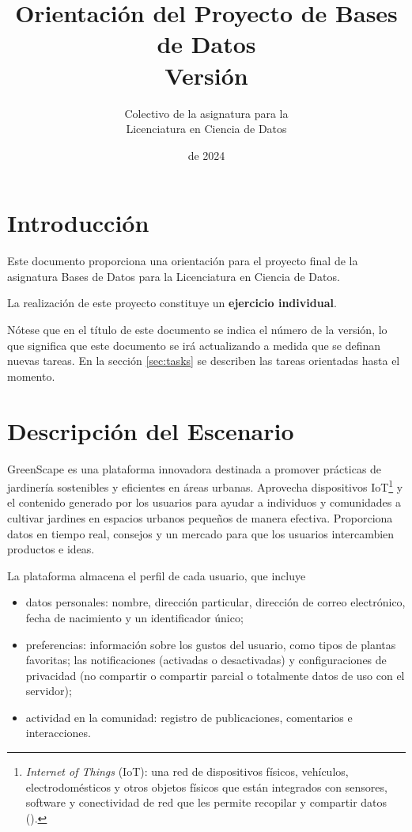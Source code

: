 \documentclass{article}
\title{Orientación del Proyecto de Bases de Datos\\{\large Versi\'on \replaced{2}{1}}}
\author{Colectivo de la asignatura para la\\ Licenciatura en Ciencia de Datos}
\date{\replaced{23 de marzo}{15 de febrero} de 2024}
\begin{document}
\maketitle

\section{Introducción}
Este documento proporciona una orientación para el proyecto final de la asignatura Bases de Datos para la Licenciatura en Ciencia de Datos. 

La realizaci\'on de este proyecto constituye un \textbf{ejercicio individual}.

N\'otese que en el t\'itulo de este documento se indica el n\'umero de la versi\'on, lo que significa que este documento se ir\'a actualizando a medida que se definan nuevas tareas. 
En la secci\'on \ref{sec:tasks} se describen las tareas orientadas hasta el momento. 

\section{Descripción del Escenario}
GreenScape es una plataforma innovadora destinada a promover prácticas de jardinería sostenibles y eficientes en áreas urbanas. Aprovecha dispositivos IoT\footnote{\textit{Internet of Things} (IoT): una red de dispositivos físicos, vehículos, electrodomésticos y otros objetos físicos que están integrados con sensores, software y conectividad de red que les permite recopilar y compartir datos (\cite{IBMInternetOfThings2024}).} y el contenido generado por los usuarios para ayudar a individuos y comunidades a cultivar jardines en espacios urbanos pequeños de manera efectiva. Proporciona datos en tiempo real, consejos y un mercado para que los usuarios intercambien productos e ideas.

La plataforma almacena el perfil de cada usuario, que incluye 
\begin{itemize}
    \item datos personales: nombre, direcci\'on particular, dirección de correo electrónico, fecha de nacimiento y un identificador \'unico;
    \item preferencias: información sobre los gustos del usuario, como tipos de plantas favoritas; las notificaciones (activadas o desactivadas) y configuraciones de privacidad (no compartir o compartir parcial o totalmente datos de uso con el servidor);
    \item actividad en la comunidad: registro de publicaciones, comentarios e interacciones. 
\end{itemize}
\end{document}
